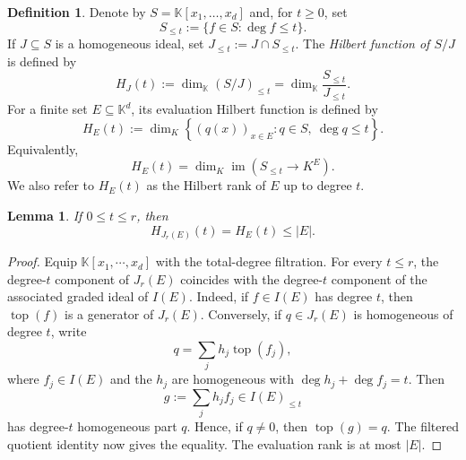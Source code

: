 \documentclass[11pt,reqno]{amsart}
\newcommand\K{\ensuremath{\mathbb{K}}}
\newtheorem{lemma}[theorem]{Lemma}
\theoremstyle{definition}
\newtheorem{definition}[theorem]{Definition}
\theoremstyle{plain}
\numberwithin{equation}{section}
\begin{document}
\begin{definition}\label{def-new-hilbert}
Denote by $S=\K[x_1,\ldots,x_d]$ and, for $t\geq0$, set
\begin{equation*}
    S_{\leq t}:=\{f\in S:\deg f\leq t\}.
\end{equation*}
If $J\subseteq S$ is a homogeneous ideal, set
$J_{\leq t}:=J\cap S_{\leq t}$. The \emph{Hilbert function of
$S/J$} is defined by
\begin{equation*}
    H_J(t)
    :=
    \dim_\K (S/J)_{\leq t}
    =
    \dim_\K\frac{S_{\leq t}}{J_{\leq t}}.
\end{equation*}
For a finite set $E\subseteq \K^d$, its evaluation Hilbert function is
defined by
\begin{equation*}
    H_E(t)
    :=
    \dim_K
    \left\{
        (q(x))_{x\in E}:
        q\in S,\ \deg q\leq t
    \right\}.
\end{equation*}
Equivalently,
\begin{equation*}
    H_E(t)
    =
    \dim_K\operatorname{im}
    \left(
        S_{\leq t}\longrightarrow K^E
    \right).
\end{equation*}
We also refer to $H_E(t)$ as the Hilbert rank of $E$ up to degree $t$.
\end{definition}

\begin{lemma}\label{lem:footprint}
If $0\leq t\leq r$, then
\begin{equation*}
    H_{J_r(E)}(t)=H_E(t)\leq |E|.
\end{equation*}
\end{lemma}
\begin{proof}
Equip $\K[x_1,\cdots,x_d]$ with the total-degree filtration. For every $t\leq r$, the degree-$t$ component of $J_r(E)$ coincides
with the degree-$t$ component of the associated graded ideal of
$I(E)$. Indeed, if $f\in I(E)$ has degree $t$, then
$\operatorname{top}(f)$ is a generator of $J_r(E)$. Conversely, if
$q\in J_r(E)$ is homogeneous of degree $t$, write
\begin{equation*}
    q=\sum_j h_j\operatorname{top}(f_j),
\end{equation*}
where $f_j\in I(E)$ and the $h_j$ are homogeneous with
$\deg h_j+\deg f_j=t$. Then
\begin{equation*}
    g:=\sum_j h_jf_j\in I(E)_{\leq t}
\end{equation*}
has degree-$t$ homogeneous part $q$. Hence, if $q\neq0$, then
$\operatorname{top}(g)=q$.  The filtered quotient
identity now gives the equality.  The evaluation rank is at most $|E|$.
\end{proof}
\end{document}
